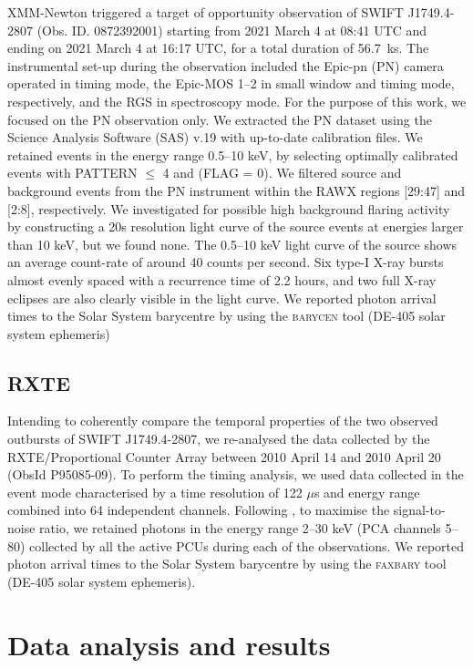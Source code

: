 \documentclass[fleqn,usenatbib]{mnras}
\newcommand{\swiftj}{SWIFT J1749.4-2807}
\newcommand{\rxte}{RXTE}
\begin{document}
XMM-Newton \citep{Jansen2001} triggered a target of opportunity observation of \swiftj{} (Obs. ID. 0872392001) starting from 2021 March 4 at 08:41 UTC and ending on 2021 March 4 at 16:17 UTC, for a total duration of 56.7~ks. 
The instrumental set-up during the observation included the Epic-pn (PN) camera operated in timing mode, the Epic-MOS 1--2 in small window and timing mode, respectively, and the RGS in spectroscopy mode. For the purpose of this work, we focused on the PN observation only. We extracted the PN dataset using the Science Analysis Software (SAS) v.19 with up-to-date calibration files. We retained events in the energy range 0.5–10 keV, by selecting optimally calibrated events with \textsc{PATTERN $\leq$ 4} and \textsc{(FLAG = 0)}. We filtered source and background events from the PN instrument within the RAWX regions [29:47] and [2:8], respectively. We investigated for possible high background flaring activity by constructing a 20s resolution light curve of the source events at energies larger than 10 keV, but we found none.  
The 0.5--10 keV light curve of the source shows an average count-rate of around 40 counts per second. Six type-I X-ray bursts almost evenly spaced with a recurrence time of 2.2 hours, and two full X-ray eclipses are also clearly visible in the light curve. We reported photon arrival times to the Solar System barycentre by using the \textsc{barycen} tool (DE-405 solar system ephemeris)


\subsection{RXTE}


Intending to coherently compare the temporal properties of the two observed outbursts of \swiftj{}, we re-analysed the data collected by the \rxte{}/Proportional Counter Array \citep[PCA; 2--60 keV;][]{Jahoda:2006uf} between 2010 April 14 and 2010 April 20 (ObsId P95085-09). To perform the timing analysis, we used data collected in the event mode characterised by a time resolution of 122 $\mu$s and energy range combined into 64 independent channels. Following \citep{Markwardt:2010tl}, to maximise the signal-to-noise ratio, we retained photons in the energy range 2--30 keV (PCA channels 5--80) collected by all the active PCUs during each of the observations. We reported photon arrival times to the Solar System barycentre by using the \textsc{faxbary} tool (DE-405 solar system ephemeris).


\section{Data analysis and results}
\label{sec:results}
\end{document}
